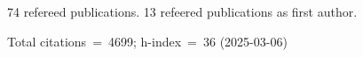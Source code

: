 74 refereed publications. 13 refeered publications as first author.

Total citations~=~4699; h-index~=~36 (2025-03-06)